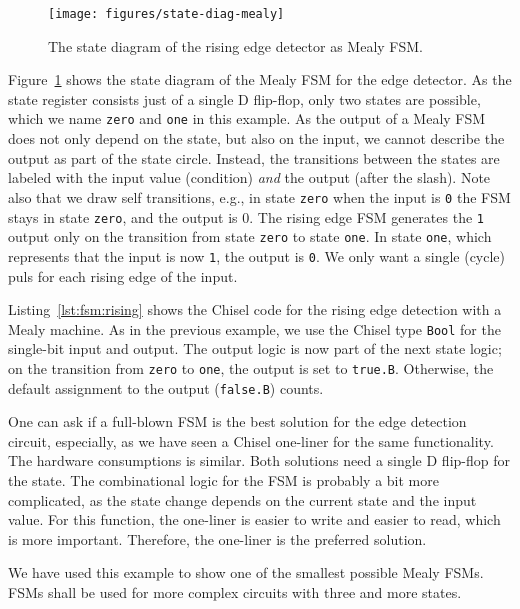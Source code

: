 \documentclass[%
    10pt,
    headinclude, footexclude,
    openright, %
    notitlepage,
    cleardoubleempty,
    headsepline,
    pointlessnumbers,
    bibtotoc, idxtotoc,
    ]{scrbook}
\newcommand{\code}[1]{{\small{\texttt{#1}}}}
\begin{document}
\begin{figure}
  \centering
  \texttt{[image: figures/state-diag-mealy]}
  \caption{The state diagram of the rising edge detector as Mealy FSM.}
  \label{fig:diag:mealy}
\end{figure}

Figure~\ref{fig:diag:mealy} shows the state diagram of the Mealy FSM for the
edge detector. As the state register consists just of a single D flip-flop,
only two states are possible, which we name \code{zero} and \code{one} in this
example.
As the output of a Mealy FSM does not only depend on the state, but also
on the input, we cannot describe the output as part of the state circle.
Instead, the transitions between the states are labeled with the input
value (condition) \emph{and} the output (after the slash).
Note also that we draw self transitions, e.g., in state \code{zero} when
the input is \code{0} the FSM stays in state \code{zero}, and the output is {0}.
The rising edge FSM generates the \code{1} output only on the transition
from state \code{zero} to state \code{one}. In state \code{one}, which represents
that the input is now \code{1}, the output is \code{0}. We only want a single (cycle)
puls for each rising edge of the input.


Listing~\ref{lst:fsm:rising} shows the Chisel code for the rising edge detection
with a Mealy machine.
As in the previous example, we use the Chisel type \code{Bool} for the
single-bit input and output.
The output logic is now part of the next state logic; on the transition from
\code{zero} to \code{one}, the output is set to \code{true.B}. Otherwise,
the default assignment to the output (\code{false.B}) counts.

One can ask if a full-blown FSM is the best solution for the edge detection circuit,
especially, as we have seen a Chisel one-liner for the same functionality.
The hardware consumptions is similar. Both solutions need a single D flip-flop
for the state. The combinational logic for the FSM is probably a bit more complicated, as
the state change depends on the current state and the input value.
For this function, the one-liner is easier to write and easier to read,
which is more important. Therefore, the one-liner is the preferred solution.

We have used this example to show one of the smallest possible Mealy FSMs.
FSMs shall be used for more complex circuits with three and more states.
\end{document}
